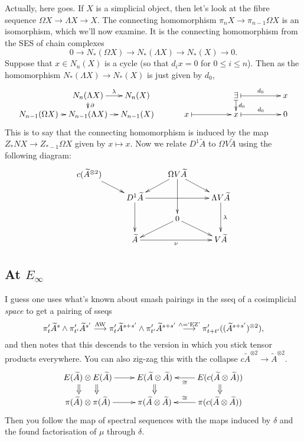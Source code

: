 \documentclass[10pt]{article}
\begin{document}
\begin{Thoughts on Adams Multiplicativity II}
Actually, here goes. If $X$ is a simplicial object, then let's look at the fibre sequence $\Omega X\to\Lambda X\to X$. The connecting homomorphism $\pi_n X\to \pi_{n-1}\Omega X$ is an isomorphism, which we'll now examine. It is the connecting homomorphism from the SES of chain complexes
\[0\to N_*(\Omega X)\to N_*(\Lambda X)\to N_* (X)\to 0.\]
Suppose that $x\in N_n(X)$ is a cycle (so that $d_ix=0$ for $0\leq i \leq n$). Then as the homomorphism $N_*(\Lambda X)\to N_*(X)$ is just given by $d_0$, 
\[\xymatrix@!0@R=8mm@C=21mm{
&%
N_n(\Lambda X)\ar[r]^-{\lambda}
\ar[d]^-{\partial}
&%
N_n(X)
&
&%
{\exists}\ar@{|->}[r]^-{d_0}
\ar@{|->}[d]^-{d_0}
&%
x
\\%
N_{n-1}(\Omega X)\ar[r]
&%
N_{n-1}(\Lambda X)\ar[r]&%
N_{n-1}(X)
&
x\ar@{|->}[r]
&%
x\ar@{|->}@{|->}[r]^-{d_0}&%
0
}\]
This is to say that the connecting homomorphism is induced by the map $Z_*NX\to Z_{*-1}\Omega X$ given by $x\mapsto x$. Now we relate $D^1\widetilde{A}$ to $\Omega V\widetilde{A}$ using the following diagram:
\[\xymatrix@R=4mm{
c(\widetilde{A}^{\otimes 2})\ar[dr]
&%
&%
\Omega V\widetilde{A}\ar[dl]
\ar[dd]
\ar[dr]
&%
\\%
&%
D^1\widetilde{A}\ar[dd]
\ar[rr]
&%
&%
\Lambda V\widetilde{A}\ar[dd]^-{\lambda}
\\%
&%
&%
0\ar[dl]
\ar[rd]
&%
\\%
&%
\widetilde{A}\ar[rr]_-{\nu}
&%
&%
V\widetilde{A}%
}\]



\subsection{At $E_\infty$}
I guess one uses what's known about smash pairings in the sseq of a cosimplicial \emph{space} to get a pairing of sseqs
\[\pi'_{t}\widetilde{A}^{s}\wedge \pi'_{t'}\widetilde{A}^{s'}\overset{\textup{AW}}{\to}\pi'_{t}\widetilde{A}^{s+s'}\wedge \pi'_{t'}\widetilde{A}^{s+s'}\overset{\wedge =\textup{`EZ'}}{\to}\pi'_{t+t'}((\widetilde{A}^{s+s'})^{\otimes 2}),\]
and then notes that this descends to the version in which you stick tensor products everywhere. You can also zig-zag this with the collapse $c\widetilde{A}^{\otimes 2}\to\widetilde{A}^{\otimes 2}$.
\[\xymatrix@R=4mm{
E(\widetilde{A})\otimes E(\widetilde{A})\ar[r]
\ar@{=>}@<2.5ex>[d]
\ar@{=>}@<-2.5ex>[d]
&%
E(\widetilde{A}\otimes \widetilde{A})
\ar@{=>}[d]
&
E(c(\widetilde{A}\otimes \widetilde{A}))
\ar[l]^-{\cong}\ar@{=>}[d]
\\%
\pi(\widetilde{A})\otimes \pi(\widetilde{A})\ar[r]&%
\pi(\widetilde{A}\otimes \widetilde{A})%
&
\pi(c(\widetilde{A}\otimes \widetilde{A}))
\ar[l]_-{\cong}
}\]
Then you follow the map of spectral sequences with the maps induced by $\delta$ and the found factorisation of $\mu$ through $\delta$.


\end{Thoughts on Adams Multiplicativity II}
\end{document}
